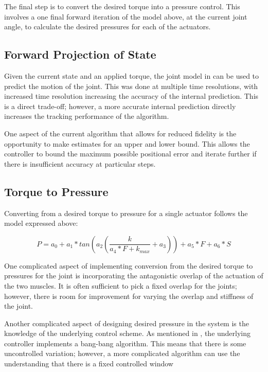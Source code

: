 The final
step is to convert the desired torque into a pressure control. This involves a 
one final forward iteration of the model above, at the current joint angle, to 
calculate the desired pressures for each of the actuators.

\subsection{Forward Projection of State}

Given the current state and an applied torque, the joint model in 
 can be used to predict the motion of the joint.
This was done at multiple time resolutions, with increased time resolution 
increasing the accuracy of the internal prediction. This is a direct trade-off;
however, a more accurate internal prediction directly increases the tracking
performance of the algorithm.

One aspect of the current algorithm that allows for reduced fidelity is the 
opportunity to make estimates for an upper and lower bound. This allows the 
controller to bound the maximum possible positional error and iterate further
if there is insufficient accuracy at particular steps.

\subsection{Torque to Pressure}

Converting from a desired torque to pressure for a single actuator follows
the model expressed above:

\begin{equation}
P = a_{0} + a_{1} * tan(a_{2} (\dfrac{k}{a_{4} * F + k_{max}} + a_{3})) + a_{5} * F + a_{6} * S
\end{equation}

One complicated aspect of implementing conversion from the desired torque to 
pressures for
the joint is incorporating the antagonistic overlap of the actuation of the two 
muscles. It is often sufficient to pick a fixed overlap for the joints; however,
there is room for improvement for varying the overlap and stiffness of the joint.

Another complicated aspect of designing desired pressure in the system is the
knowledge of the underlying control scheme. As mentioned in \cite{HuntPMuscles},
the underlying controller implements a bang-bang algorithm. This means that 
there is some uncontrolled variation; however, a more complicated algorithm
can use the understanding that there is a fixed controlled window

